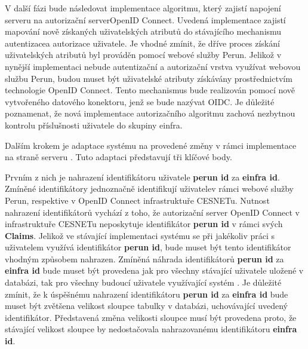 \documentclass[
  printed, %
  twoside, %
  table,   %
  nolof,     %
  nolot,     %
]{fithesis3}
\begin{document}
V další fázi bude následovat implementace algoritmu, který zajistí napojení serveru  na autorizační server\break OpenID Connect. Uvedená implementace zajistí mapování nově získaných uživatelských atributů do stávajícího mechanismu autentizace\break a autorizace uživatele. Je vhodné zmínit, že dříve proces získání uživatelských atributů byl prováděn pomocí webové služby Perun. Jelikož v nynější implementaci nebude autentizační a autorizační vrstva využívat webovou službu Perun, budou muset být uživatelské atributy získávány prostřednictvím technologie OpenID Connect. Tento mechanismus bude realizován pomocí nově vytvořeného datového konektoru, jenž se bude nazývat OIDC. Je důležité poznamenat, že nová implementace autorizačního algoritmu zachová nezbytnou kontrolu příslušnosti uživatele do skupiny einfra. 
\par

Dalším krokem je adaptace systému  na provedené změny v rámci implementace na straně serveru . Tuto adaptaci představují tři klíčové body. 

\par 

Prvním z nich je nahrazení identifikátoru uživatele \textbf{perun id} za \textbf{einfra id}. Zmíněné identifikátory jednoznačně identifikují uživatele\break v rámci webové služby Perun, respektive v OpenID Connect infrastruktuře CESNETu. Nutnost nahrazení identifikátorů vychází z toho, že autorizační server OpenID Connect v infrastruktuře CESNETu neposkytuje identifikátor \textbf{perun id} v rámci svých \textbf{Claims}. Jelikož ve stávající implementaci systému  se při jakékoliv práci s uživatelem využívá identifikátor \textbf{perun id}, bude muset být tento identifikátor vhodným způsobem nahrazen. Zmíněná náhrada identifikátorů \textbf{perun id} za \textbf{einfra id} bude muset být provedena jak pro všechny stávající uživatele uložené v databázi, tak pro všechny budoucí uživatele využívající systém . Je důležité zmínit, že k úspěšnému nahrazení identifikátoru \textbf{perun id} za \textbf{einfra id} bude muset být zvětšena velikost sloupce tabulky v databázi, uchovávající uvedený identifikátor. Představená změna velikosti sloupce musí být provedena proto, že stávající velikost sloupce by nedostačovala nahrazovanému identifikátoru \textbf{einfra id}. 
\par
\end{document}
